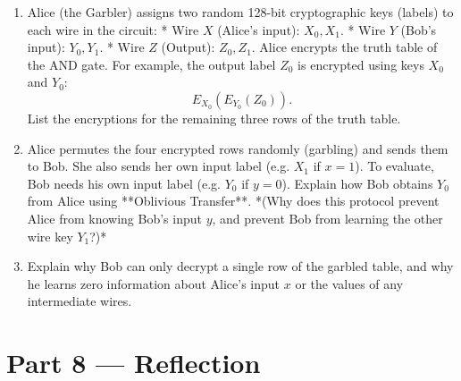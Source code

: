 \documentclass[12pt, a4paper]{book}
\begin{document}
\begin{deepbox}
\begin{enumerate}[label=\textbf{D\arabic*.}]
        \begin{enumerate}[label=(\alph*)]
          \item Alice (the Garbler) assigns two random 128-bit cryptographic keys (labels) to each wire in the circuit:
                * Wire $X$ (Alice's input): $X_0, X_1$.
                * Wire $Y$ (Bob's input): $Y_0, Y_1$.
                * Wire $Z$ (Output): $Z_0, Z_1$.
                Alice encrypts the truth table of the AND gate.
                For example, the output label $Z_0$ is encrypted using keys $X_0$ and $Y_0$:
                \[
                  E_{X_0}\left( E_{Y_0}(Z_0) \right).
                \]
                List the encryptions for the remaining three rows of the truth table.
          \item Alice permutes the four encrypted rows randomly (garbling) and sends them to Bob.
                She also sends her own input label (e.g. $X_1$ if $x=1$).
                To evaluate, Bob needs his own input label (e.g. $Y_0$ if $y=0$).
                Explain how Bob obtains $Y_0$ from Alice using **Oblivious Transfer**.
                *(Why does this protocol prevent Alice from knowing Bob's input $y$, and prevent Bob from learning the other wire key $Y_1$?)*
          \item Explain why Bob can only decrypt a single row of the garbled table, and why he learns zero information about Alice's input $x$ or the values of any intermediate wires.
        \end{enumerate}
\end{enumerate}
\end{deepbox}

\newpage

\section{Part 8 --- Reflection}
\end{document}
